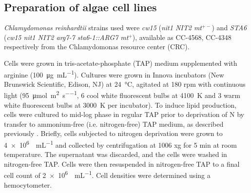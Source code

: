\documentclass[aps,pra,reprint,superscriptaddress]{revtex4-1}
\begin{document}
\subsection{Preparation of algae cell lines}

\textit{Chlamydomonas reinhardtii} strains used were \textit{cw15} (\textit{nit1 NIT2 mt$^{+-}$}) and \textit{STA6} (\textit{cw15 nit1 NIT2 arg7-7 sta6-1::ARG7 mt$^+$}), available as CC-4568, CC-4348 respectively from the Chlamydomonas resource center (CRC)\cite{minnesota2015chlamydomonas}.

Cells were grown in tris-acetate-phosphate (TAP) medium supplemented with arginine (\SI{100}{\micro\gram\per\milli\liter}). Cultures were grown in Innova incubators (New Brunswick Scientific, Edison, NJ) at \SI{24}{\degreeCelsius}, agitated at 180 rpm with continuous light (\SI{95}{\micro\mole\per\square\meter\per\second}, 6 cool white fluorescent bulbs at \SI{4100}{\kelvin} and 3 warm white fluorescent bulbs at \SI{3000}{\kelvin} per incubator). To induce lipid production, cells were cultured to mid-log phase in regular TAP prior to deprivation of N by transfer to ammonium-free (i.e. nitrogen-free) TAP medium, as described previously \cite{blaby2013systems}. Briefly, cells subjected to nitrogen deprivation were grown to \SI{4e6}{\cells\per\milli\liter} and collected by centrifugation at 1006 xg for 5 min at room temperature. The supernatant was discarded, and the cells were washed in nitrogen-free TAP. Cells were then resuspended in nitrogen-free TAP to a final cell count of \SI{2e6}{\cells\per\milli\liter}. Cell densities were determined using a hemocytometer.




\end{document}
